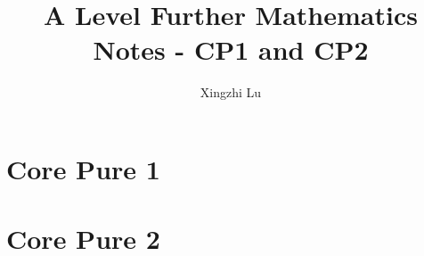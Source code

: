 \documentclass[oneside,fleqn,11pt]{book}
\title{A Level Further Mathematics Notes - CP1 and CP2}
\author{Xingzhi Lu}
\date{}
\begin{document}
\everymath{\displaystyle}
\maketitle
\tableofcontents
\pagebreak
\part{Core Pure 1}


\setcounter{chapter}{0}

\part{Core Pure 2}

\end{document}
